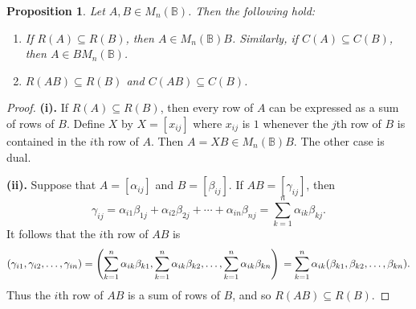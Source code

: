 \documentclass[11pt]{article}
\newtheorem{prop}[thm]{Proposition}
\numberwithin{equation}{section}
\newcommand{\B}{\mathbb{B}}
\newcommand{\Bn}{M_n(\B)}
\begin{document}
\begin{prop}
  Let $A, B \in \Bn$. Then the following hold:
  \begin{enumerate}[label=\roman*]

    \item
      If $R(A) \subseteq R(B)$, then $A \in \Bn B$.  Similarly, if $C(A)
      \subseteq C(B)$, then $A \in B \Bn$.

    \item 
      $R(AB) \subseteq R(B)$ and $C(AB) \subseteq C(B)$.
  \end{enumerate}
\end{prop}
\begin{proof}
  \noindent \textbf{(i).}
  If $R(A) \subseteq R(B)$, then every row of $A$ can be expressed as a sum of
  rows of $B$. Define $X$ by $X = [x_{ij}]$ where $x_{ij}$ is $1$ whenever the
  $j$th row of $B$ is contained in the $i$th row of $A$. Then $A = XB \in \Bn
  B$.  The other case is dual.
  \bigskip

  \noindent \textbf{(ii).}
  Suppose that $A = [\alpha_{ij}]$ and $B = [\beta_{ij}]$. If 
  $AB = [\gamma_{ij}]$, then 
  \[
  \gamma_{ij} = \alpha_{i1} \beta_{1j} + \alpha_{i2}\beta_{2j} 
                + \cdots + \alpha_{in}\beta_{nj}
              = \sum_{k = 1} ^ {n} \alpha_{ik}\beta_{kj}.
  \]
  It follows that the $i$th row of $AB$ is 
  \[
  (\gamma_{i1}, \gamma_{i2}, \ldots, \gamma_{in})
   =  \left (\sum_{k = 1} ^ {n} \alpha_{ik}\beta_{k1},
     \sum_{k = 1} ^ {n} \alpha_{ik}\beta_{k2},
     \ldots, 
     \sum_{k = 1} ^ {n} \alpha_{ik}\beta_{kn}\right) \\
    =
    \sum_{k = 1} ^ {n} 
    \alpha_{ik}
    (\beta_{k1}, \beta_{k2}, \ldots, \beta_{kn}).
  \]
  Thus the $i$th row of $AB$ is a sum of rows of $B$, and so $R(AB) \subseteq
  R(B)$. 
\end{proof}
\end{document}
